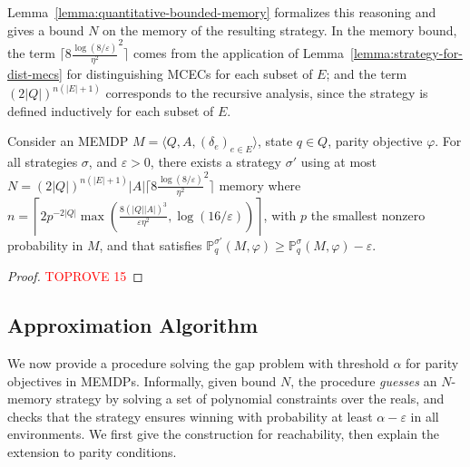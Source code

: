 \documentclass[a4paper,USenglish,cleveref, autoref, thm-restate]{lipics-v2021}
\let\epsilon\varepsilon
\def\abs#1{\ensuremath{\lvert #1 \rvert}}
\newcommand{\tuple}[1]{\langle #1 \rangle}
\newcommand*{\pr}{\mathbb{P}}
\def\Act{A}
\begin{document}
Lemma~\ref{lemma:quantitative-bounded-memory} formalizes this reasoning and gives a bound $N$ on the memory of the resulting strategy. In the memory bound, 
the term
$\lceil 8\frac{\log(8/\epsilon)}{\eta^2}^2\rceil$ comes from the application of Lemma~\ref{lemma:strategy-for-dist-mecs} for distinguishing MCECs for each subset of $E$; and the term $(2\abs{Q})^{n(\abs{E}+1)}$ corresponds to the recursive analysis, since the strategy is defined inductively for each subset of $E$.


  \begin{lemma}
    \label{lemma:quantitative-bounded-memory}
    Consider an MEMDP $M=\tuple{Q,A,(\delta_e)_{e\in E}}$, state $q \in Q$, parity objective $\varphi$.
    For all strategies $\sigma$, and $\epsilon>0$,
    there exists a strategy $\sigma'$ 
    using at most 
    $N = (2\abs{Q})^{n(\abs{E}+1)}\abs{\Act}\lceil 8\frac{\log(8/\epsilon)}{\eta^2}^2\rceil$
    memory 
    where $n = \left\lceil 2p^{-2\abs{Q}}\max(\frac{8(\abs{Q}\abs{\Act})^3}{\epsilon\eta^2}, \log(16/\epsilon))\right\rceil$,
    with $p$ the smallest nonzero probability in $M$,
    and that satisfies $\pr_q^{\sigma'}(M, \varphi) \geq \pr_q^{\sigma}(M, \varphi)-\epsilon$.  
 \end{lemma}

\begin{proof}\textcolor{red}{TOPROVE 15}\end{proof}

\subsection{Approximation Algorithm}\label{sec:approx_alg}

We now provide a procedure solving the gap problem with threshold $\alpha$ for parity objectives in MEMDPs.
Informally, given bound $N$, the procedure \emph{guesses} an $N$-memory strategy by solving 
a set of polynomial constraints over the reals,
and checks that the strategy ensures winning with probability at least $\alpha - \epsilon$
in all environments.
We first give the construction for reachability, then explain the extension to parity conditions.
\end{document}
